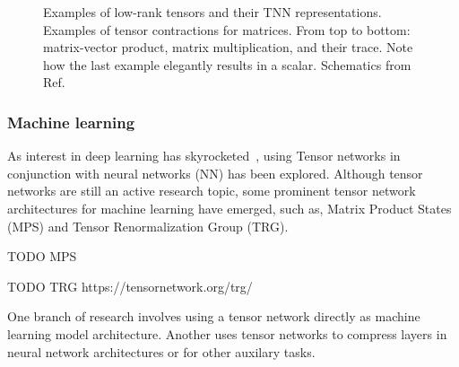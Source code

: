 \begin{figure}[htb]
    \centering
     \qquad
    
    \caption{\protect{} Examples of low-rank tensors and their TNN representations. \protect{} Examples of tensor contractions for matrices. From top to bottom: matrix-vector product, matrix multiplication, and their trace. Note how the last example elegantly results in a scalar. Schematics from Ref.~\cite{Stoudenmire2021}}
    \label{fig:tensor_diagrams}
\end{figure}



\subsubsection{Machine learning}

As interest in deep learning has skyrocketed~\cite{DL_review}, using Tensor networks in conjunction with neural networks (NN) has been explored.
Although tensor networks are still an active research topic, some prominent tensor network architectures for machine learning have emerged, such as, Matrix Product States (MPS) and Tensor Renormalization Group (TRG).

TODO MPS


TODO TRG https://tensornetwork.org/trg/


One branch of research involves using a tensor network directly as machine learning model architecture. Another uses tensor networks to compress layers in neural network architectures or for other auxilary tasks.

